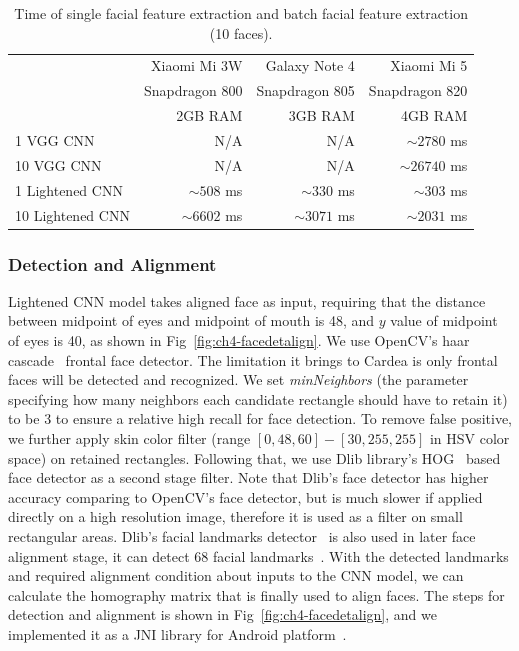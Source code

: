 \begin{table}[!htbp]
\centering
\caption{Time of single facial feature extraction and batch facial feature extraction (10 faces).}
\label{tbl-forwardingtime}
\begin{tabular}{lrrr}
\toprule
 & Xiaomi Mi 3W & Galaxy Note 4 & Xiaomi Mi 5\\
 & {\small Snapdragon 800} & {\small Snapdragon 805} & {\small Snapdragon 820}\\
 & {\small 2GB RAM} & {\small 3GB RAM} & {\small 4GB RAM}\\
 \midrule
1 VGG CNN & N/A & N/A & $\sim 2780$ ms \\
10 VGG CNN & N/A & N/A & $\sim 26740$ ms \\
1 Lightened CNN & $\sim 508$ ms & $\sim 330$ ms & $\sim 303$ ms \\
10 Lightened CNN & $\sim 6602$ ms & $\sim 3071$ ms & $\sim 2031$ ms \\
 \bottomrule

\end{tabular}
\end{table}


\subsubsection{Detection and Alignment}
Lightened CNN model takes aligned face as input, requiring that the distance between midpoint of eyes and midpoint of mouth is 48, and $y$ value of midpoint of eyes is 40, as shown in Fig~\ref{fig:ch4-facedetalign}. We use OpenCV's haar cascade~\cite{links:opencv,viola2001rapid} frontal face detector. The limitation it brings to Cardea is only frontal faces will be detected and recognized. We set \emph{minNeighbors} (the parameter specifying how many neighbors each candidate rectangle should have to retain it) to be 3 to ensure a relative high recall for face detection. To remove false positive, we further apply skin color filter (range $[0, 48, 60] - [30, 255, 255]$ in HSV color space) on retained rectangles. Following that, we use Dlib library's HOG~\cite{links:dlib,dalal2005histograms} based face detector as a second stage filter. Note that Dlib's face detector has higher accuracy comparing to OpenCV's face detector, but is much slower if applied directly on a high resolution image, therefore it is used as a filter on small rectangular areas. Dlib's facial landmarks detector~\cite{links:dlibfacepose} is also used in later face alignment stage, it can detect 68 facial landmarks~\cite{links:dlibfacelandmarkspos, links:dlibfacelandmarkscoords}. With the detected landmarks and required alignment condition about inputs to the CNN model, we can calculate the homography matrix that is finally used to align faces. The steps for detection and alignment is shown in Fig~\ref{fig:ch4-facedetalign}, and we implemented it as a JNI library for Android platform~\cite{links:facealignjni}.

